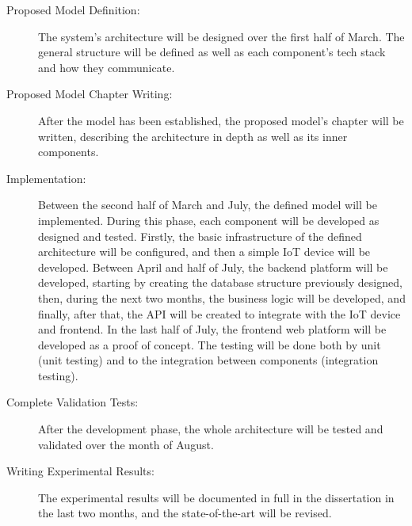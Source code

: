 \begin{description}
	\item[Proposed Model Definition:] The system's architecture will be designed
	      over the first half of March. The general structure will be defined as
	      well as each component's tech stack and how they communicate.
	\item[Proposed Model Chapter Writing:]  After the model has been established,
	      the proposed model's chapter will be written, describing the architecture
	      in depth as well as its inner components.
	\item[Implementation:] Between the second half of March and July, the defined model will be
	      implemented. During this phase, each component will be developed as designed
	      and tested. Firstly, the basic infrastructure of the defined
	      architecture will be configured, and then a simple \gls{IoT} device will
	      be developed. Between April and half of July, the backend platform
	      will be developed, starting by creating the database structure
	      previously designed, then, during the next two months, the business
	      logic will be developed, and finally, after that, the \gls{API} will be
	      created to integrate with the \gls{IoT} device and frontend. In the
	      last half of July, the frontend web platform will be developed as a
	      proof of concept.
	      The testing will be done both by unit (unit testing) and to the
	      integration between components (integration testing).
	\item[Complete Validation Tests: ]After the development phase, the whole
	      architecture will be tested and validated over the month of August.
	\item[Writing Experimental Results:] The experimental results will be
	      documented in full in the dissertation in the last two months, and
	      the state-of-the-art will be revised.
\end{description}

